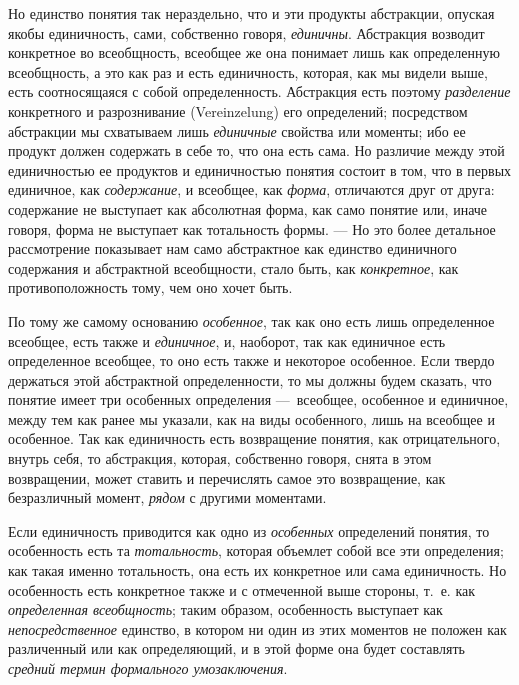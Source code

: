 \documentclass[twoside]{article}
\begin{document}
{{Но единство понятия так нераздельно, что и эти продукты
абстракции, опуская якобы единичность, сами, собственно говоря,
{\em единичны}.
Абстракция возводит конкретное во всеобщность, всеобщее же
она понимает лишь как определенную всеобщность, а это как раз и есть
единичность, которая, как мы видели выше, есть соотносящаяся с собой
определенность. Абстракция есть поэтому
{\em разделение}
конкретного и разрознивание (Vereinzelung) его
определений; посредством абстракции мы схватываем лишь
{\em единичные} свойства
или моменты; ибо ее продукт должен содержать в себе то, что она есть сама.
Но различие между этой единичностью ее продуктов и единичностью понятия
состоит в том, что в первых единичное, как
{\em содержание}, и
всеобщее, как {\em форма},
отличаются друг от друга: содержание не выступает как
абсолютная форма, как само понятие или, иначе говоря, форма не выступает
как тотальность формы. — Но это более детальное рассмотрение
показывает нам само абстрактное как единство единичного содержания и
абстрактной всеобщности, стало быть, как
{\em конкретное}, как
противоположность тому, чем оно хочет быть.

По тому же самому основанию
{\em особенное}, так как
оно есть лишь определенное всеобщее, есть также и
{\em единичное}, и,
наоборот, так как единичное есть определенное всеобщее, то оно есть также и
некоторое особенное. Если твердо держаться этой абстрактной определенности,
то мы должны будем сказать, что понятие имеет три особенных
определения —~всеобщее, особенное и
единичное, между тем как ранее мы указали, как на виды особенного, лишь на
всеобщее и особенное. Так как единичность есть возвращение понятия, как
отрицательного, внутрь себя, то абстракция, которая, собственно говоря,
снята в этом возвращении, может ставить и перечислять самое это
возвращение, как безразличный момент,
{\em рядом} с другими моментами.

Если единичность приводится как одно из
{\em особенных}
определений понятия, то особенность есть та
{\em тотальность},
которая объемлет собой все эти определения; как такая именно
тотальность, она есть их конкретное или сама единичность. Но особенность
есть конкретное также и с отмеченной выше стороны, т.~е. как
{\em определенная всеобщность};
таким образом, особенность выступает как
{\em непосредственное}
единство, в котором ни один из этих моментов не положен как
различенный или как определяющий, и в этой форме она будет составлять
{\em средний термин формального умозаключения}.

}}
\end{document}

